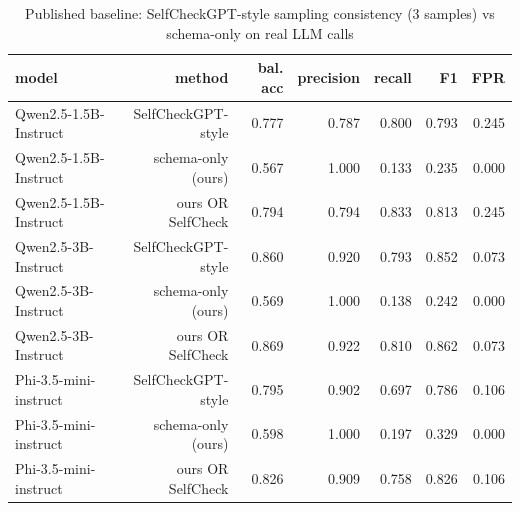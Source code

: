 \begin{table}[t]
\centering
\caption{Published baseline: SelfCheckGPT-style sampling consistency (3 samples) vs schema-only on real LLM calls}
\label{tab:selfcheck_baseline}
\begin{tabular}{lrrrrrr}
\hline
model & method & bal. acc & precision & recall & F1 & FPR \\
\hline
Qwen2.5-1.5B-Instruct & SelfCheckGPT-style & 0.777 & 0.787 & 0.800 & 0.793 & 0.245 \\
Qwen2.5-1.5B-Instruct & schema-only (ours) & 0.567 & 1.000 & 0.133 & 0.235 & 0.000 \\
Qwen2.5-1.5B-Instruct & ours OR SelfCheck & 0.794 & 0.794 & 0.833 & 0.813 & 0.245 \\
Qwen2.5-3B-Instruct & SelfCheckGPT-style & 0.860 & 0.920 & 0.793 & 0.852 & 0.073 \\
Qwen2.5-3B-Instruct & schema-only (ours) & 0.569 & 1.000 & 0.138 & 0.242 & 0.000 \\
Qwen2.5-3B-Instruct & ours OR SelfCheck & 0.869 & 0.922 & 0.810 & 0.862 & 0.073 \\
Phi-3.5-mini-instruct & SelfCheckGPT-style & 0.795 & 0.902 & 0.697 & 0.786 & 0.106 \\
Phi-3.5-mini-instruct & schema-only (ours) & 0.598 & 1.000 & 0.197 & 0.329 & 0.000 \\
Phi-3.5-mini-instruct & ours OR SelfCheck & 0.826 & 0.909 & 0.758 & 0.826 & 0.106 \\
\hline
\end{tabular}
\end{table}
